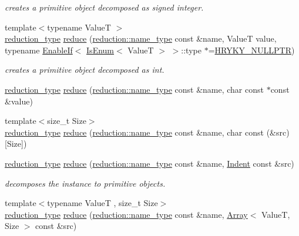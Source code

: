 \begin{DoxyCompactItemize}
\begin{DoxyCompactList}\small\item\em creates a primitive object decomposed as signed integer. \end{DoxyCompactList}\item 
{\footnotesize template$<$typename Value\-T $>$ }\\\hyperlink{namespacehryky_a343a9a4c36a586be5c2693156200eadc}{reduction\-\_\-type} \hyperlink{namespacehryky_a1bb7073c9b976de9dfe63ab7190b6e28}{reduce} (\hyperlink{namespacehryky_1_1reduction_ac686c30a4c8d196bbd0f05629a6b921f}{reduction\-::name\-\_\-type} const \&name, Value\-T value, typename \hyperlink{classhryky_1_1_enable_if}{Enable\-If}$<$ \hyperlink{classhryky_1_1_is_enum}{Is\-Enum}$<$ Value\-T $>$ $>$\-::type $\ast$=\hyperlink{common_8h_a4cd4ac09cfcdbd6b30ee69afc156e210}{H\-R\-Y\-K\-Y\-\_\-\-N\-U\-L\-L\-P\-T\-R})
\begin{DoxyCompactList}\small\item\em creates a primitive object decomposed as int. \end{DoxyCompactList}\item 
\hyperlink{namespacehryky_a343a9a4c36a586be5c2693156200eadc}{reduction\-\_\-type} \hyperlink{namespacehryky_a5fee3acd5567815500b7df844ec4ea71}{reduce} (\hyperlink{namespacehryky_1_1reduction_ac686c30a4c8d196bbd0f05629a6b921f}{reduction\-::name\-\_\-type} const \&name, char const $\ast$const \&value)
\item 
{\footnotesize template$<$size\-\_\-t Size$>$ }\\\hyperlink{namespacehryky_a343a9a4c36a586be5c2693156200eadc}{reduction\-\_\-type} \hyperlink{namespacehryky_ad7fa2b6d153fe3ccc4318fb9c9ea81a7}{reduce} (\hyperlink{namespacehryky_1_1reduction_ac686c30a4c8d196bbd0f05629a6b921f}{reduction\-::name\-\_\-type} const \&name, char const (\&src)\mbox{[}Size\mbox{]})
\item 
\hypertarget{namespacehryky_a4b78e2caf2c7b67b9eef3fbc20bc68ed}{\hyperlink{namespacehryky_a343a9a4c36a586be5c2693156200eadc}{reduction\-\_\-type} \hyperlink{namespacehryky_a4b78e2caf2c7b67b9eef3fbc20bc68ed}{reduce} (\hyperlink{namespacehryky_1_1reduction_ac686c30a4c8d196bbd0f05629a6b921f}{reduction\-::name\-\_\-type} const \&name, \hyperlink{classhryky_1_1_indent}{Indent} const \&src)}\label{namespacehryky_a4b78e2caf2c7b67b9eef3fbc20bc68ed}

\begin{DoxyCompactList}\small\item\em decomposes the instance to primitive objects. \end{DoxyCompactList}\item 
\hypertarget{namespacehryky_aa477737bab9053e12bd5640f91549b26}{{\footnotesize template$<$typename Value\-T , size\-\_\-t Size$>$ }\\\hyperlink{namespacehryky_a343a9a4c36a586be5c2693156200eadc}{reduction\-\_\-type} \hyperlink{namespacehryky_aa477737bab9053e12bd5640f91549b26}{reduce} (\hyperlink{namespacehryky_1_1reduction_ac686c30a4c8d196bbd0f05629a6b921f}{reduction\-::name\-\_\-type} const \&name, \hyperlink{classhryky_1_1_array}{Array}$<$ Value\-T, Size $>$ const \&src)}\label{namespacehryky_aa477737bab9053e12bd5640f91549b26}


\end{DoxyCompactItemize}
